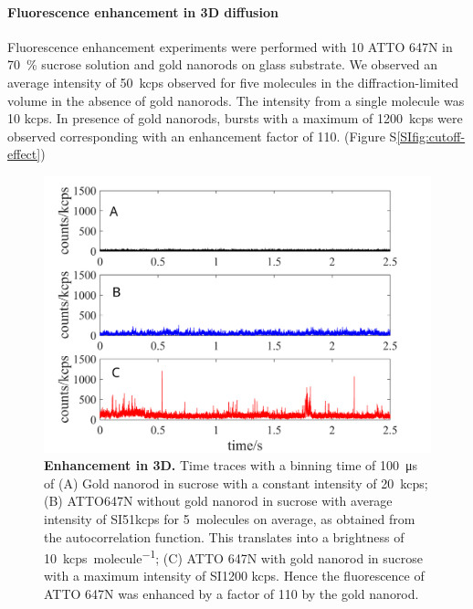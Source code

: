 \paragraph*{Fluorescence enhancement in 3D diffusion}
Fluorescence enhancement experiments were performed with \SI{10}{\nM} ATTO 647N in \SI{70}{\percent} sucrose solution and gold nanorods on glass substrate.
We observed an average intensity of \SI{50}{kcps} observed for five molecules in the diffraction-limited volume in the absence of gold nanorods.
The intensity from a single molecule was 10 kcps.
In presence of gold nanorods, bursts with a maximum of \SI{1200}{kcps} were observed corresponding with an enhancement factor of 110. (Figure S\ref{SIfig:cutoff-effect})
\begin{figure}%
  \centering
  \includegraphics[width=\textwidth]{3D_enhc}
  \makeatletter
  \renewcommand{\fnum@figure}{\figurename~S\thefigure}
  \makeatother{}
  \caption{\textbf{Enhancement in 3D.} Time traces with a binning time of \SI{100}{\us} of (A) Gold nanorod in sucrose with a constant intensity of \SI{20}{kcps}; (B) ATTO647N without gold nanorod in sucrose with average intensity of SI{51}{kcps} for \SI{5}{ molecules} on average, as obtained from the autocorrelation function.
  This translates into a brightness of \SI{10}{ kcps\per molecule}; (C) ATTO 647N with gold nanorod in sucrose with a maximum intensity of SI{1200}{ kcps}.
  Hence the fluorescence of ATTO 647N was enhanced by a factor of 110 by the gold nanorod.}
  \label{SIfig:3D-enhc}
\end{figure}

